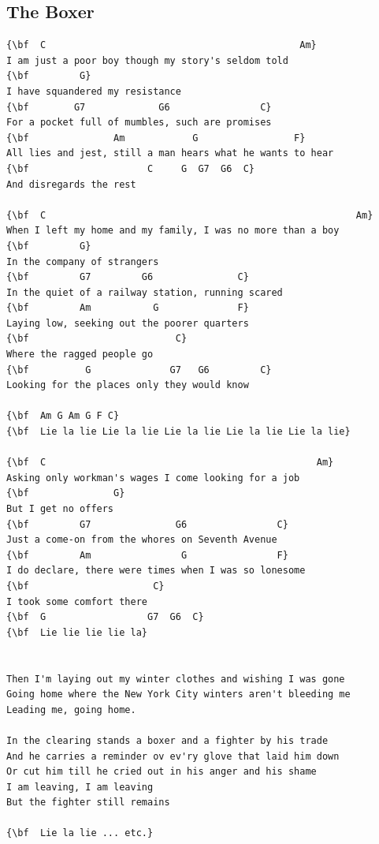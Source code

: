 \documentclass[a4paper]{article}
\begin{document}
\subsection{The Boxer}
\begin{Verbatim}[commandchars=\\\{\}]
{\bf  C                                             Am}
I am just a poor boy though my story's seldom told
{\bf         G}
I have squandered my resistance
{\bf        G7             G6                C}
For a pocket full of mumbles, such are promises
{\bf               Am            G                 F}
All lies and jest, still a man hears what he wants to hear
{\bf                     C     G  G7  G6  C}
And disregards the rest

{\bf  C                                                       Am}
When I left my home and my family, I was no more than a boy
{\bf         G}
In the company of strangers
{\bf         G7         G6               C}
In the quiet of a railway station, running scared
{\bf         Am           G              F}
Laying low, seeking out the poorer quarters
{\bf                          C}
Where the ragged people go
{\bf          G              G7   G6         C}
Looking for the places only they would know

{\bf  Am G Am G F C}
{\bf  Lie la lie Lie la lie Lie la lie Lie la lie Lie la lie}

{\bf  C                                                Am}
Asking only workman's wages I come looking for a job
{\bf               G}
But I get no offers
{\bf         G7               G6                C}
Just a come-on from the whores on Seventh Avenue
{\bf         Am                G                F}
I do declare, there were times when I was so lonesome
{\bf                      C}
I took some comfort there
{\bf  G                  G7  G6  C}
{\bf  Lie lie lie lie la}


Then I'm laying out my winter clothes and wishing I was gone
Going home where the New York City winters aren't bleeding me
Leading me, going home.

In the clearing stands a boxer and a fighter by his trade
And he carries a reminder ov ev'ry glove that laid him down
Or cut him till he cried out in his anger and his shame
I am leaving, I am leaving
But the fighter still remains

{\bf  Lie la lie ... etc.}


\end{Verbatim}
\newpage
\end{document}
